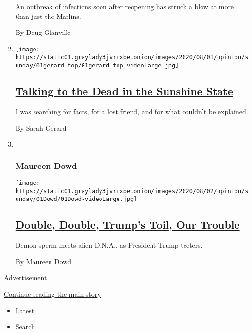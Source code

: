 \begin{enumerate}
  An outbreak of infections soon after reopening has struck a blow at
  more than just the Marlins.

  By Doug Glanville
\item
  \texttt{[image: https://static01.graylady3jvrrxbe.onion/images/2020/08/01/opinion/sunday/01gerard-top/01gerard-top-videoLarge.jpg]}

  \hypertarget{talking-to-the-dead-in-the-sunshine-state}{%
  \subsection{\texorpdfstring{\href{/2020/08/01/opinion/spiritualism-cassadaga-florida.html}{Talking
  to the Dead in the Sunshine
  State}}{Talking to the Dead in the Sunshine State}}\label{talking-to-the-dead-in-the-sunshine-state}}

  I was searching for facts, for a lost friend, and for what couldn't be
  explained.

  By Sarah Gerard
\item ~
  \hypertarget{maureen-dowd}{%
  \subsubsection{Maureen Dowd}\label{maureen-dowd}}

  \texttt{[image: https://static01.graylady3jvrrxbe.onion/images/2020/08/02/opinion/sunday/01Dowd/01Dowd-videoLarge.jpg]}

  \hypertarget{double-double-trumps-toil-our-trouble}{%
  \subsection{\texorpdfstring{\href{/2020/08/01/opinion/sunday/trump-coronavirus-herman-cain.html}{Double,
  Double, Trump's Toil, Our
  Trouble}}{Double, Double, Trump's Toil, Our Trouble}}\label{double-double-trumps-toil-our-trouble}}

  Demon sperm meets alien D.N.A., as President Trump teeters.

  By Maureen Dowd
\end{enumerate}

Advertisement

\protect\hyperlink{after-mid1}{Continue reading the main story}

\begin{itemize}
\tightlist
\item
  \protect\hyperlink{stream-panel}{Latest}
\item
  Search
\end{itemize}

